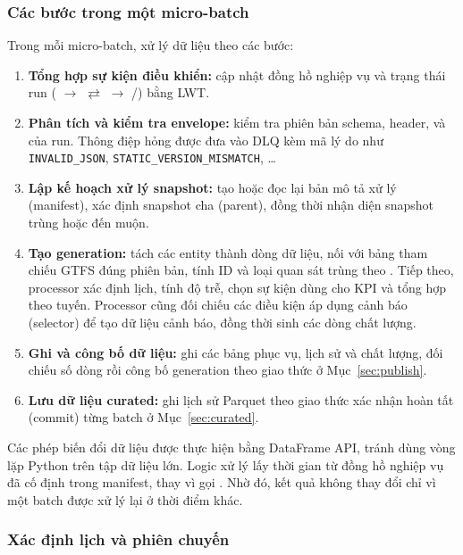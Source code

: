 \subsubsection{Các bước trong một micro-batch}

Trong mỗi micro-batch,  xử lý dữ liệu theo các bước:
\begin{enumerate}
    \item \textbf{Tổng hợp sự kiện điều khiển:} cập nhật đồng hồ nghiệp vụ và trạng thái run ( $\rightarrow$  $\rightleftarrows$  $\rightarrow$ /) bằng LWT.
    \item \textbf{Phân tích và kiểm tra envelope:} kiểm tra phiên bản schema, header,  và  của run. Thông điệp hỏng được đưa vào DLQ kèm mã lý do như \texttt{INVALID\_JSON}, \texttt{STATIC\_VERSION\_MISMATCH}, \ldots
    \item \textbf{Lập kế hoạch xử lý snapshot:} tạo hoặc đọc lại bản mô tả xử lý (manifest), xác định snapshot cha (parent), đồng thời nhận diện snapshot trùng hoặc đến muộn.
    \item \textbf{Tạo generation:} tách các entity thành dòng dữ liệu, nối với bảng tham chiếu GTFS đúng phiên bản, tính ID và loại quan sát trùng theo . Tiếp theo, processor xác định lịch, tính độ trễ, chọn sự kiện dùng cho KPI và tổng hợp theo tuyến. Processor cũng đối chiếu các điều kiện áp dụng cảnh báo (selector) để tạo dữ liệu cảnh báo, đồng thời sinh các dòng chất lượng.
    \item \textbf{Ghi và công bố dữ liệu:} ghi các bảng phục vụ, lịch sử và chất lượng, đối chiếu số dòng rồi công bố generation theo giao thức ở Mục~\ref{sec:publish}.
    \item \textbf{Lưu dữ liệu curated:} ghi lịch sử Parquet theo giao thức xác nhận hoàn tất (commit) từng batch ở Mục~\ref{sec:curated}.
\end{enumerate}
Các phép biến đổi dữ liệu được thực hiện bằng DataFrame API, tránh dùng vòng lặp Python trên tập dữ liệu lớn. Logic xử lý lấy thời gian từ đồng hồ nghiệp vụ đã cố định trong manifest, thay vì gọi . Nhờ đó, kết quả không thay đổi chỉ vì một batch được xử lý lại ở thời điểm khác.

\subsubsection{Xác định lịch và phiên chuyến}

